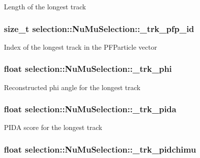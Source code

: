 Length of the longest track \hypertarget{classselection_1_1NuMuSelection_acbc163e95eec5a3bbbf3648480737a56}{
\subsubsection[{\-\_\-trk\-\_\-pfp\-\_\-id}]{\setlength{\rightskip}{0pt plus 5cm}size\-\_\-t selection\-::\-Nu\-Mu\-Selection\-::\-\_\-trk\-\_\-pfp\-\_\-id\hspace{0.3cm}{\ttfamily [private]}}}\label{classselection_1_1NuMuSelection_acbc163e95eec5a3bbbf3648480737a56}
Index of the longest track in the P\-F\-Particle vector \hypertarget{classselection_1_1NuMuSelection_aeb0b180b3bbe753b576c4db2fa3f94af}{
\subsubsection[{\-\_\-trk\-\_\-phi}]{\setlength{\rightskip}{0pt plus 5cm}float selection\-::\-Nu\-Mu\-Selection\-::\-\_\-trk\-\_\-phi\hspace{0.3cm}{\ttfamily [private]}}}\label{classselection_1_1NuMuSelection_aeb0b180b3bbe753b576c4db2fa3f94af}
Reconstructed phi angle for the longest track \hypertarget{classselection_1_1NuMuSelection_ae2b400954b0bce9930437be4fdb7fd85}{
\subsubsection[{\-\_\-trk\-\_\-pida}]{\setlength{\rightskip}{0pt plus 5cm}float selection\-::\-Nu\-Mu\-Selection\-::\-\_\-trk\-\_\-pida\hspace{0.3cm}{\ttfamily [private]}}}\label{classselection_1_1NuMuSelection_ae2b400954b0bce9930437be4fdb7fd85}
P\-I\-D\-A score for the longest track \hypertarget{classselection_1_1NuMuSelection_a3ae2c291adeedd490d43b915257553f7}{
\subsubsection[{\-\_\-trk\-\_\-pidchimu}]{\setlength{\rightskip}{0pt plus 5cm}float selection\-::\-Nu\-Mu\-Selection\-::\-\_\-trk\-\_\-pidchimu\hspace{0.3cm}{\ttfamily [private]}}}\label{classselection_1_1NuMuSelection_a3ae2c291adeedd490d43b915257553f7}

